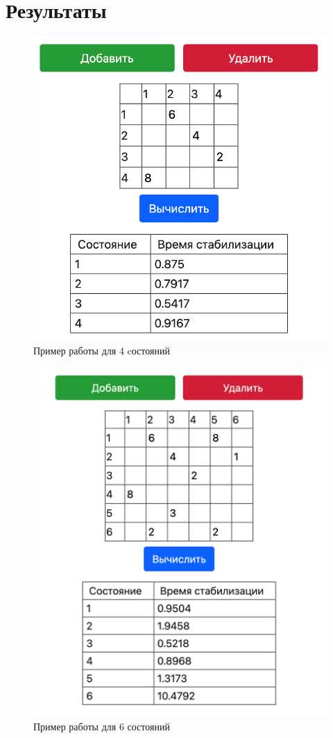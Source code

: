 \documentclass[a4paper, 12pt]{article}
\begin{document}
\section{{Результаты}}
\begin{figure}[h!]
	\centering \includegraphics[scale=0.6]{1}
	\centering\caption{Пример работы для 4 cостояний}
\end{figure}
\begin{figure}[h!]
	\centering \includegraphics[scale=0.6]{2}
	\centering\caption{Пример работы для 6 состояний}
\end{figure}
\end{document}
